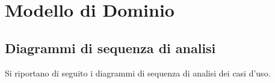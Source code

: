 %
%	 
%

\chapter{Modello di Dominio}

\section{Diagrammi di sequenza di analisi}
Si riportano di seguito i diagrammi di sequenza di analisi dei casi d'uso.


\pagebreak
